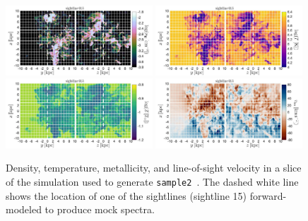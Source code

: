 \documentclass[fleqn,usenatbib]{mnras}
\begin{document}
\begin{figure}
    \centering
    \includegraphics[width=0.49\textwidth]{figures/sample2/projections/density_projection_maps_SL_15.jpg}
    \includegraphics[width=0.49\textwidth]{figures/sample2/projections/temperature_projection_maps_SL_15.jpg} \\
    \includegraphics[width=0.49\textwidth]{figures/sample2/projections/metallicity_projection_maps_SL_15.jpg}
    \includegraphics[width=0.49\textwidth]{figures/sample2/projections/velocity_projection_maps_SL_15.jpg}
    \caption{
    Density, temperature, metallicity, and line-of-sight velocity in a slice of the simulation used to generate \texttt{sample2}~\citep{mandelker2020Instability}.
    The dashed white line shows the location of one of the sightlines (sightline 15) forward-modeled to produce mock spectra.
    }
    \label{f: sample2 ray 15 appendix}
\end{figure}
\end{document}
